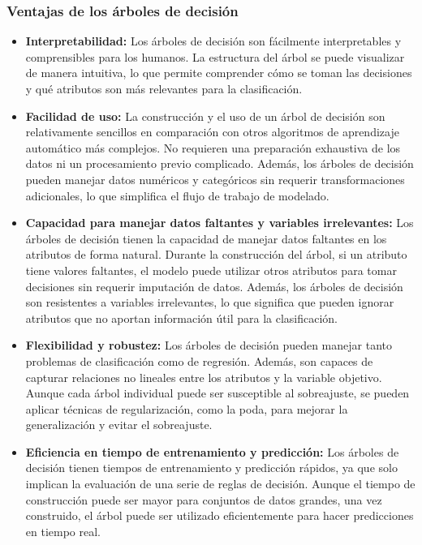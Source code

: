 \subsubsection{Ventajas de los árboles de decisión}
\begin{itemize}
    \item \textbf{Interpretabilidad:} Los árboles de decisión son fácilmente interpretables y comprensibles para los humanos. La estructura del árbol se puede visualizar de manera intuitiva, lo que permite comprender cómo se toman las decisiones y qué atributos son más relevantes para la clasificación.
    \item \textbf{Facilidad de uso:} La construcción y el uso de un árbol de decisión son relativamente sencillos en comparación con otros algoritmos de aprendizaje automático más complejos. No requieren una preparación exhaustiva de los datos ni un procesamiento previo complicado. Además, los árboles de decisión pueden manejar datos numéricos y categóricos sin requerir transformaciones adicionales, lo que simplifica el flujo de trabajo de modelado.
    \item \textbf{Capacidad para manejar datos faltantes y variables irrelevantes:} Los árboles de decisión tienen la capacidad de manejar datos faltantes en los atributos de forma natural. Durante la construcción del árbol, si un atributo tiene valores faltantes, el modelo puede utilizar otros atributos para tomar decisiones sin requerir imputación de datos. Además, los árboles de decisión son resistentes a variables irrelevantes, lo que significa que pueden ignorar atributos que no aportan información útil para la clasificación.
    \item \textbf{Flexibilidad y robustez:} Los árboles de decisión pueden manejar tanto problemas de clasificación como de regresión. Además, son capaces de capturar relaciones no lineales entre los atributos y la variable objetivo. Aunque cada árbol individual puede ser susceptible al sobreajuste, se pueden aplicar técnicas de regularización, como la poda, para mejorar la generalización y evitar el sobreajuste.
    \item \textbf{Eficiencia en tiempo de entrenamiento y predicción:} Los árboles de decisión tienen tiempos de entrenamiento y predicción rápidos, ya que solo implican la evaluación de una serie de reglas de decisión. Aunque el tiempo de construcción puede ser mayor para conjuntos de datos grandes, una vez construido, el árbol puede ser utilizado eficientemente para hacer predicciones en tiempo real.
\end{itemize}

